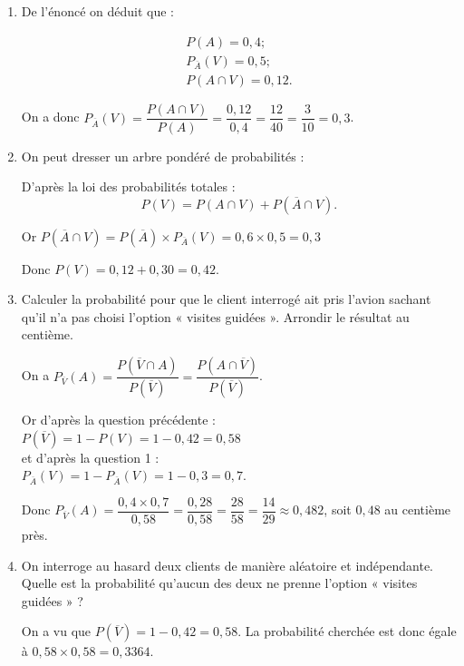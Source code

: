 \documentclass[10pt]{article}
\begin{document}
\begin{enumerate}
	\item 	De l’énoncé on déduit que :
	
	\[
	\begin{array}{l}
		P(A) = 0,4; \\
		P_{\overline{A}}(V) = 0,5; \\
		P(A \cap V) = 0,12.
	\end{array}
	\]
	
	On a donc $P_{\overline{A}}(V) = \dfrac{P(A \cap V)}{P(A)} = \dfrac{0,12}{0,4} = \dfrac{12}{40} = \dfrac{3}{10} = 0,3$.
	
	\item
	On peut dresser un arbre pondéré de probabilités :\\
	
	D’après la loi des probabilités totales :
	\[
	P(V) = P(A \cap V) + P(\overline{A} \cap V).
	\]
	
	Or $P(\overline{A} \cap V) = P(\overline{A}) \times P_{\overline{A}}(V) = 0,6 \times 0,5 = 0,3$ 
	
	Donc $P(V) = 0,12 + 0,30 = 0,42$.
	
	\item
	Calculer la probabilité pour que le client interrogé ait pris l’avion sachant qu’il n’a pas choisi l’option « visites guidées ». Arrondir le résultat au centième.
	
	On a $P_{\overline{V}}(A) = \dfrac{P(\overline{V} \cap A)}{P(\overline{V})} = \dfrac{P(A \cap \overline{V})}{P(\overline{V})}$.
	
	Or d’après la question précédente : \\
	$P(\overline{V}) = 1 - P(V) = 1 - 0,42 = 0,58$\\
	 et d’après la question 1 :\\
	  $P_{\overline{A}}(V) = 1 - P_{\overline{A}}(V) = 1 - 0,3 = 0,7$.
	
	Donc $P_{\overline{V}}(A) = \dfrac{0,4 \times 0,7}{0,58} = \dfrac{0,28}{0,58} = \dfrac{28}{58} = \dfrac{14}{29} \approx 0,482$, soit $0,48$ au centième près.
	
	\item
	On interroge au hasard deux clients de manière aléatoire et indépendante. Quelle est la probabilité qu’aucun des deux ne prenne l’option « visites guidées » ?
	
	On a vu que $P(\overline{V}) = 1 - 0,42 = 0,58$. La probabilité cherchée est donc égale à $0,58 \times 0,58 = 0,3364$.
\end{enumerate}
\end{document}
